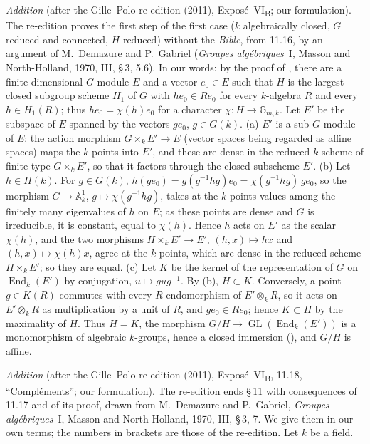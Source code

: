 \par\medskip\noindent
\emph{Addition} (after the Gille--Polo re-edition (2011), Expos\'e~VI\textsubscript{B};
our formulation). The re-edition proves the first step of the first case (\(k\)
algebraically closed, \(G\) reduced and connected, \(H\) reduced) without the
\emph{Bible}, from 11.16, by an argument of M.~Demazure and P.~Gabriel
(\emph{Groupes alg\'ebriques}~I, Masson and North-Holland, 1970, III, \S\,3, 5.6). In
our words: by the proof of , there are a
finite-dimensional \(G\)-module \(E\) and a vector \(e_0\in E\) such that \(H\) is the
largest closed subgroup scheme \(H_1\) of \(G\) with \(he_0\in Re_0\) for every
\(k\)-algebra \(R\) and every \(h\in H_1(R)\); thus \(he_0=\chi(h)e_0\) for a character
\(\chi:H\to\mathbb G_{m,k}\). Let \(E'\) be the subspace of \(E\) spanned by the vectors
\(ge_0\), \(g\in G(k)\). (a) \(E'\) is a sub-\(G\)-module of \(E\): the action morphism
\(G\times_kE'\to E\) (vector spaces being regarded as affine spaces) maps the
\(k\)-points into \(E'\), and these are dense in the reduced \(k\)-scheme of finite type
\(G\times_kE'\), so that it factors through the closed subscheme \(E'\). (b) Let
\(h\in H(k)\). For \(g\in G(k)\), \(h(ge_0)=g(g^{-1}hg)e_0=\chi(g^{-1}hg)\,ge_0\), so the
morphism \(G\to\mathbb A^1_k\), \(g\mapsto\chi(g^{-1}hg)\), takes at the \(k\)-points
values among the finitely many eigenvalues of \(h\) on \(E\); as these points are dense
and \(G\) is irreducible, it is constant, equal to \(\chi(h)\). Hence \(h\) acts on
\(E'\) as the scalar \(\chi(h)\), and the two morphisms \(H\times_kE'\to E'\),
\((h,x)\mapsto hx\) and \((h,x)\mapsto\chi(h)x\), agree at the \(k\)-points, which are
dense in the reduced scheme \(H\times_kE'\); so they are equal. (c) Let \(K\) be the
kernel of the representation of \(G\) on \(\operatorname{End}_k(E')\) by conjugation,
\(u\mapsto gug^{-1}\). By (b), \(H\subset K\). Conversely, a point \(g\in K(R)\) commutes
with every \(R\)-endomorphism of \(E'\otimes_kR\), so it acts on \(E'\otimes_kR\) as
multiplication by a unit of \(R\), and \(ge_0\in Re_0\); hence \(K\subset H\) by the
maximality of \(H\). Thus \(H=K\), the morphism
\(G/H\to\operatorname{GL}(\operatorname{End}_k(E'))\) is a monomorphism of algebraic
\(k\)-groups, hence a closed immersion
\textup{()}, and \(G/H\) is affine.

\par\medskip\noindent
\emph{Addition} (after the Gille--Polo re-edition (2011), Expos\'e~VI\textsubscript{B},
11.18, ``Compl\'ements''; our formulation). The re-edition ends \S\,11 with consequences
of 11.17 and of its proof, drawn from M.~Demazure and P.~Gabriel, \emph{Groupes
alg\'ebriques}~I, Masson and North-Holland, 1970, III, \S\,3, 7. We give them in our own
terms; the numbers in brackets are those of the re-edition. Let \(k\) be a field.

